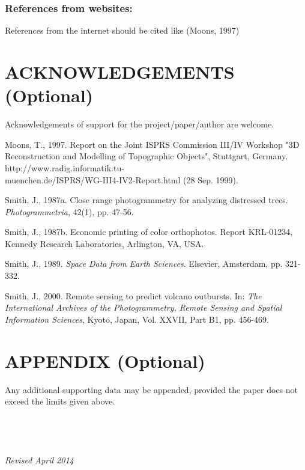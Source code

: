 \documentclass{isprs}
\begin{document}
\subsubsection{References from websites:}
References from the internet should be cited like (Moons, 1997)

\section*{ACKNOWLEDGEMENTS (Optional)}\label{ACKNOWLEDGEMENTS}

Acknowledgements of support for the project/paper/author are welcome. 

{%
	\begin{spacing}{0.9}%
	\end{spacing}
}
Moons, T., 1997. Report on the Joint ISPRS Commission III/IV Workshop 
"3D Reconstruction and Modelling of Topographic Objects", Stuttgart, Germany.
{http://www.radig.informatik.tu-}\\
{muenchen.de/ISPRS/WG-III4-IV2-Report.html} (28 Sep. 1999).

Smith, J., 1987a. Close range photogrammetry for analyzing distressed trees. 
\textit{Photogrammetria}, 42(1), pp. 47-56.

Smith, J., 1987b. Economic printing of color orthophotos. Report KRL-01234, Kennedy Research Laboratories, Arlington, VA, USA.

Smith, J., 1989. \textit{Space Data from Earth Sciences}. Elsevier, Amsterdam, pp. 321-332.

Smith, J., 2000. Remote sensing to predict volcano outbursts. 
In: \textit{The International Archives of the Photogrammetry, Remote 
Sensing and Spatial Information Sciences}, Kyoto, 
Japan, Vol. XXVII, Part B1, pp. 456-469.



\section*{APPENDIX (Optional)}\label{APPENDIX}

Any additional supporting data may be appended, provided the paper does not exceed the limits given above. 
\\
\\
\\
\\
\\
\textit{Revised April 2014}
\end{document}
